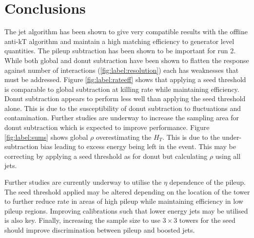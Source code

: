 \section{Conclusions}
The jet algorithm has been shown to give very compatible results with the offline anti-kT algorithm and maintain a high matching efficiency to generator level quantities. The pileup subtraction has been shown to be important for  run 2. While both global and donut subtraction have been shown to flatten the response against number of interactions (\ref{fig:label:resolution}) each has weaknesses that must be addressed. Figure \ref{fig:label:rateeff} shows that applying a seed threshold is comparable to global subtraction at killing rate while maintaining efficiency. Donut subtraction appears to perform less well than applying the seed threshold alone. This is due to the susceptibility of donut subtraction to fluctuations and contamination. Further studies are underway to increase the sampling area for donut subtraction which is expected to improve performance. Figure \ref{fig:label:sums} shows global $\rho$ overestimating the $H_T$. This is due to the under-subtraction bias leading to excess energy being left in the event. This may be correcting by applying a seed threshold as for donut but calculating $\rho$ using all jets. 

Further studies are currently underway to utilise the $\eta$ dependence of the pileup.  The seed threshold applied may be altered depending on the location of the tower to further reduce rate in areas of high pileup while maintaining efficiency in low pileup regions. Improving calibrations such that lower energy jets may be utilised is also key. Finally, increasing the sample size to use $3\times3$ towers for the seed should improve discrimination between pileup and boosted jets. 

    
